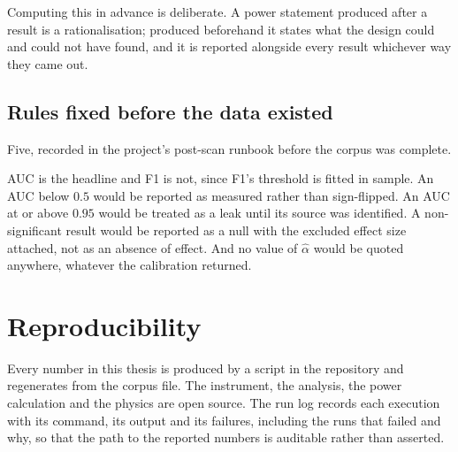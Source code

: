 Computing this in advance is deliberate. A power statement produced after a result is a
rationalisation; produced beforehand it states what the design could and could not have found,
and it is reported alongside every result whichever way they came out.

\subsection{Rules fixed before the data existed}

Five, recorded in the project's post-scan runbook before the corpus was complete.

AUC is the headline and F1 is not, since F1's threshold is fitted in sample. An AUC below
$0.5$ would be reported as measured rather than sign-flipped. An AUC at or above $0.95$ would
be treated as a leak until its source was identified. A non-significant result would be
reported as a null with the excluded effect size attached, not as an absence of effect. And no
value of $\hat{\alpha}$ would be quoted anywhere, whatever the calibration returned.

\section{Reproducibility}

Every number in this thesis is produced by a script in the repository and regenerates from the
corpus file. The instrument, the analysis, the power calculation and the physics are open
source. The run log records each execution with its command, its output and its failures,
including the runs that failed and why, so that the path to the reported numbers is auditable
rather than asserted.
